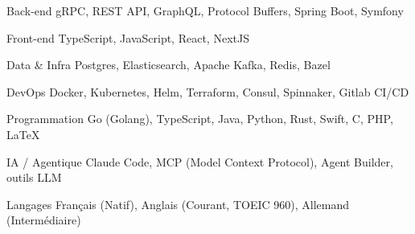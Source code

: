 

\begin{cvskills}

\cvskill
  {Back-end} %
  {gRPC, REST API, GraphQL, Protocol Buffers, Spring Boot, Symfony} %

  \cvskill
    {Front-end} %
    {TypeScript, JavaScript, React, NextJS} %

  \cvskill
    {Data \& Infra} %
    {Postgres, Elasticsearch, Apache Kafka, Redis, Bazel} %

  \cvskill
    {DevOps} %
    {Docker, Kubernetes, Helm, Terraform, Consul, Spinnaker, Gitlab CI/CD} %

  \cvskill
    {Programmation} %
    {Go (Golang), TypeScript, Java, Python, Rust, Swift, C, PHP, LaTeX} %

  \cvskill
    {IA / Agentique} %
    {Claude Code, MCP (Model Context Protocol), Agent Builder, outils LLM} %

  \cvskill
    {Langages} %
    {Français (Natif), Anglais (Courant, TOEIC 960), Allemand (Intermédiaire)} %

\end{cvskills}
